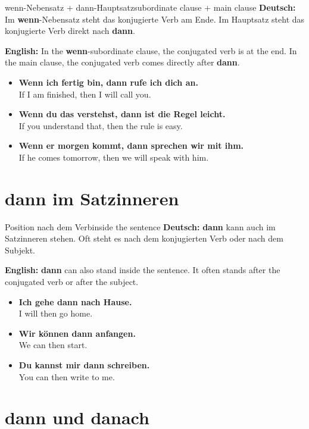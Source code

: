 \documentclass[a4paper,11pt]{article}
\newcommand{\GermanText}[1]{\textbf{Deutsch: }#1\par}
\newcommand{\EnglishText}[1]{{\small\color{SoftGray}\textbf{English: }#1\par}}
\newcommand{\ExampleItem}[2]{\item \textbf{#1}\\{\small\color{SoftGray}#2}}
\begin{document}
\begin{grammarentry}{wenn-Nebensatz + dann-Hauptsatz}{subordinate clause + main clause}
\GermanText{Im \textbf{wenn}-Nebensatz steht das konjugierte Verb am Ende. Im Hauptsatz steht das konjugierte Verb direkt nach \textbf{dann}.}
\EnglishText{In the \textbf{wenn}-subordinate clause, the conjugated verb is at the end. In the main clause, the conjugated verb comes directly after \textbf{dann}.}

\begin{exbox}
\begin{itemize}
    \ExampleItem{Wenn ich fertig bin, dann rufe ich dich an.}{If I am finished, then I will call you.}
    \ExampleItem{Wenn du das verstehst, dann ist die Regel leicht.}{If you understand that, then the rule is easy.}
    \ExampleItem{Wenn er morgen kommt, dann sprechen wir mit ihm.}{If he comes tomorrow, then we will speak with him.}
\end{itemize}
\end{exbox}
\end{grammarentry}

\section{dann im Satzinneren}

\begin{grammarentry}{Position nach dem Verb}{inside the sentence}
\GermanText{\textbf{dann} kann auch im Satzinneren stehen. Oft steht es nach dem konjugierten Verb oder nach dem Subjekt.}
\EnglishText{\textbf{dann} can also stand inside the sentence. It often stands after the conjugated verb or after the subject.}

\begin{exbox}
\begin{itemize}
    \ExampleItem{Ich gehe dann nach Hause.}{I will then go home.}
    \ExampleItem{Wir können dann anfangen.}{We can then start.}
    \ExampleItem{Du kannst mir dann schreiben.}{You can then write to me.}
\end{itemize}
\end{exbox}
\end{grammarentry}

\section{dann und danach}
\end{document}
